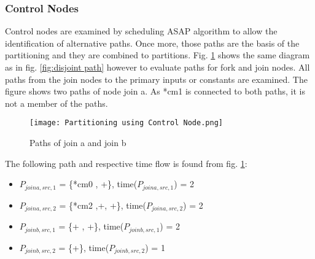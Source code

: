 \documentclass[conference]{IEEEtran}
\begin{document}
\subsubsection{Control Nodes}
Control nodes are examined by scheduling ASAP algorithm to allow the identification of alternative paths. Once more, those paths are the basis of the partitioning and they are combined to partitions. 
Fig. \ref{fig:control node} shows the same diagram as in fig. \ref{fig:disjoint path} however to evaluate paths for fork and join nodes. All paths from the join nodes to the primary inputs or constants are examined. The figure shows two paths of node join a. As *cm1 is connected to both paths, it is not a member of the paths. 
\begin{figure}[h!]
    \centering
    \texttt{[image: Partitioning using Control Node.png]}
    \caption{Paths of join a and join b \cite{Ret} }
    \label{fig:control node}
\end{figure}

The following path and respective time flow is found from fig. \ref{fig:control node}:
\begin{itemize}
    \item $P_{join a,src,1}$ = \{*cm0 , +\}, time($P_{join a,src,1}$) = 2
    \item $P_{join a,src,2}$ = \{*cm2 ,+, +\}, time($P_{join a,src,2}$) = 2
    \item $P_{join b,src,1}$ = \{+ , +\}, time($P_{join b,src,1}$) = 2
    \item $P_{join b,src,2}$ = \{+\}, time($P_{join b,src,2}$) = 1    
\end{itemize}





\end{document}
